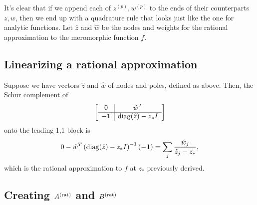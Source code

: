 It's clear that if we append each of $z^{(p)},w^{(p)}$
to the ends of their counterparts $z,w$, then we end up with
a quadrature rule that looks just like the one for analytic 
functions. Let $\hat{z}$ and $\hat{w}$ be the nodes and weights
for the rational approximation to the meromorphic function $f$.

\subsection{Linearizing a rational approximation}

Suppose we have vectors $\hat{z}$ and $\hat{w}$ of
nodes and poles, defined as above. Then,
the Schur complement of
\[
 \left[
 \begin{array}{c | c}
  0 & \hat{w}^T \\ \hline
  -{\bf 1} & \operatorname{diag}(\hat{z}) - z_\ast I
 \end{array}
 \right]
\]
onto the leading 1,1 block is
\[
 0 - \hat{w}^T \left(\operatorname{diag}(\hat{z}) - z_\ast I\right)^{-1}
     (-{\bf 1})
 = 
 \sum_j \frac{\hat{w}_j}{\hat{z}_j - z_\ast},
\]
which is the rational approximation to $f$ at $z_\ast$
previously derived.

\subsection{Creating $A^{(\text{rat})}$ and $B^{(\text{rat})}$}


